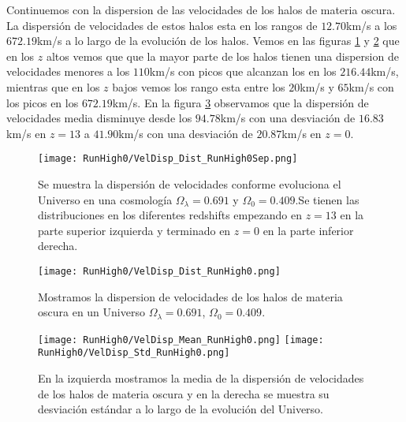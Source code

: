 Continuemos con la dispersion de las velocidades de los halos de materia oscura. La dispersión de velocidades de estos halos esta en los rangos de $12.70$km/s a los $672.19$km/s a lo largo de la evolución de los halos. Vemos en las figuras \ref{fig:High0-VelDispDistSep} y \ref{fig:High0-VelDispDist} que en los $z$ altos vemos que que la mayor parte de los halos tienen una dispersion de velocidades menores a los $110$km/s con picos que alcanzan los en los $216.44$km/s, mientras que en los $z$ bajos vemos los rango esta entre los $20$km/s y $65$km/s con los picos en los $672.19$km/s. En la figura \ref{fig:High0-VelDispStats} observamos que la dispersión de velocidades media disminuye desde los $94.78$km/s con una desviación de $16.83$km/s en $z=13$ a $41.90$km/s con una desviación de $20.87$km/s en $z=0$.

\begin{figure}[H]
    \centering
    \texttt{[image: RunHigh0/VelDisp\_Dist\_RunHigh0Sep.png]}
    \caption[Dispersión de velocidades]{\footnotesize Se muestra la dispersión de velocidades conforme evoluciona el Universo en una cosmología $\Omega_\lambda = 0.691$ y $\Omega_0 = 0.409$.Se tienen las distribuciones en los diferentes redshifts empezando en $z=13$ en la parte superior izquierda y terminado en $z=0$ en la parte inferior derecha.}
    \label{fig:High0-VelDispDistSep}
\end{figure}

\begin{figure}[H]
    \centering
    \texttt{[image: RunHigh0/VelDisp\_Dist\_RunHigh0.png]}
    \caption[Distribución de la dispersión de velocidades]{\footnotesize Mostramos la dispersion de velocidades de los halos de materia oscura en un Universo $\Omega_\lambda = 0.691$, $\Omega_0 = 0.409$.}
    \label{fig:High0-VelDispDist}
\end{figure}

\begin{figure}[H]
    \centering
    \texttt{[image: RunHigh0/VelDisp\_Mean\_RunHigh0.png]}
    \texttt{[image: RunHigh0/VelDisp\_Std\_RunHigh0.png]}
    \caption[Media y desviación estándar de la dispersión de velocidades]{\footnotesize En la izquierda mostramos la media de la dispersión de velocidades de los halos de materia oscura y en la derecha se muestra su desviación estándar a lo largo de la evolución del Universo.}
    \label{fig:High0-VelDispStats}
\end{figure}

